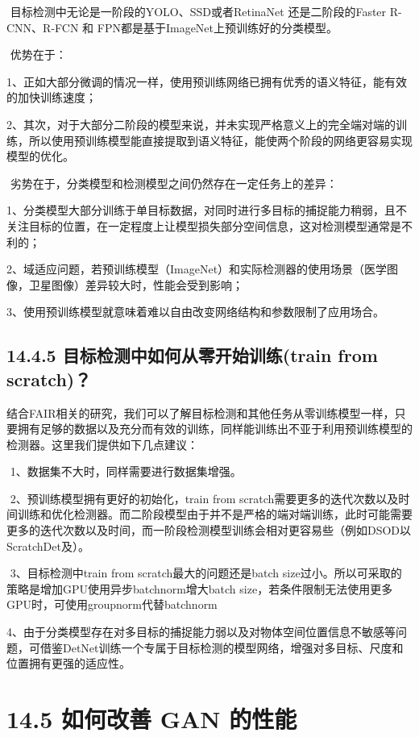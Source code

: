 ​ 目标检测中无论是一阶段的YOLO、SSD或者RetinaNet 还是二阶段的Faster
R-CNN、R-FCN 和 FPN都是基于ImageNet上预训练好的分类模型。

​ 优势在于：

​
1、正如大部分微调的情况一样，使用预训练网络已拥有优秀的语义特征，能有效的加快训练速度；

​
2、其次，对于大部分二阶段的模型来说，并未实现严格意义上的完全端对端的训练，所以使用预训练模型能直接提取到语义特征，能使两个阶段的网络更容易实现模型的优化。

​ 劣势在于，分类模型和检测模型之间仍然存在一定任务上的差异：

​
1、分类模型大部分训练于单目标数据，对同时进行多目标的捕捉能力稍弱，且不关注目标的位置，在一定程度上让模型损失部分空间信息，这对检测模型通常是不利的；

​
2、域适应问题，若预训练模型（ImageNet）和实际检测器的使用场景（医学图像，卫星图像）差异较大时，性能会受到影响；

​ 3、使用预训练模型就意味着难以自由改变网络结构和参数限制了应用场合。

\subsection{14.4.5 目标检测中如何从零开始训练(train from
scratch)？}\label{ux76eeux6807ux68c0ux6d4bux4e2dux5982ux4f55ux4eceux96f6ux5f00ux59cbux8badux7ec3train-from-scratch}

​
结合FAIR相关的研究，我们可以了解目标检测和其他任务从零训练模型一样，只要拥有足够的数据以及充分而有效的训练，同样能训练出不亚于利用预训练模型的检测器。这里我们提供如下几点建议：

​ 1、数据集不大时，同样需要进行数据集增强。

​ 2、预训练模型拥有更好的初始化，train from
scratch需要更多的迭代次数以及时间训练和优化检测器。而二阶段模型由于并不是严格的端对端训练，此时可能需要更多的迭代次数以及时间，而一阶段检测模型训练会相对更容易些（例如DSOD以ScratchDet及）。

​ 3、目标检测中train from scratch最大的问题还是batch
size过小。所以可采取的策略是增加GPU使用异步batchnorm增大batch
size，若条件限制无法使用更多GPU时，可使用groupnorm代替batchnorm

​
4、由于分类模型存在对多目标的捕捉能力弱以及对物体空间位置信息不敏感等问题，可借鉴DetNet训练一个专属于目标检测的模型网络，增强对多目标、尺度和位置拥有更强的适应性。

\section{14.5 如何改善 GAN
的性能}\label{ux5982ux4f55ux6539ux5584-gan-ux7684ux6027ux80fd}

